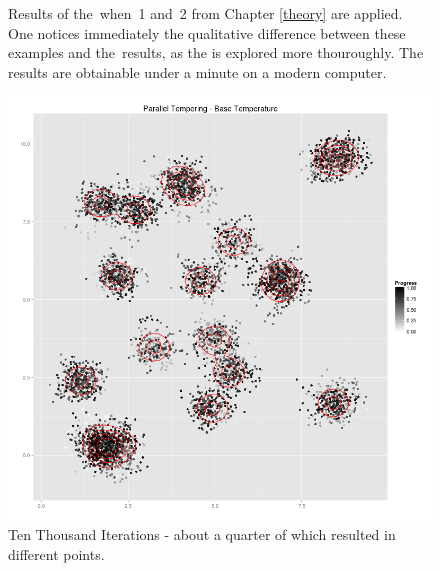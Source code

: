 \begin{figure}
\begin{minipage}[b]{.5\linewidth}
	\end{minipage}
	\caption{Results of the \PT\,when \strat\,1 and \strat\,2 from Chapter \ref{theory} are applied. One notices immediately the qualitative difference between these examples and the \MH\,results, as the \sspace is explored more thouroughly. The results are obtainable under a minute on a modern computer.}\label{PTshort}
\end{figure}

\begin{figure}[ht]
	\centering 
	\includegraphics[width=\textwidth,keepaspectratio]{./img/PT_simululation_base_temperature_10000_steps_1.png}
	\caption{Ten Thousand Iterations - about a quarter of which resulted in different points.}\label{PTlong}
\end{figure}